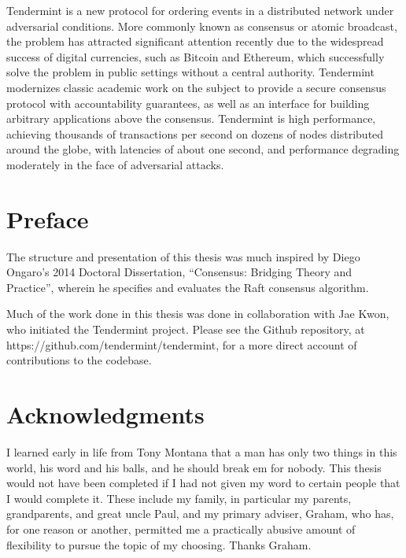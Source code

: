 \vspace{0.9cm}
Tendermint is a new protocol for ordering events in a distributed network under adversarial conditions.
More commonly known as consensus or atomic broadcast, the problem has attracted significant attention
recently due to the widespread success of digital currencies, such as Bitcoin and Ethereum,
which successfully solve the problem in public settings without a central authority.
Tendermint modernizes classic academic work on the subject to provide a secure consensus protocol with 
accountability guarantees, as well as an interface for building arbitrary applications above the consensus.
Tendermint is high performance, achieving thousands of transactions per second on dozens of nodes distributed around the globe,
with latencies of about one second, and performance degrading moderately in the face of adversarial attacks.

\clearpage

\thispagestyle{plain}
\par\vspace*{.35\textheight}{\centering Dedicated to Theda. \par}

\chapter*{Preface}
The structure and presentation of this thesis was much inspired by Diego Ongaro's 2014 Doctoral Dissertation, 
``Consensus: Bridging Theory and Practice'', wherein he specifies and evaluates the Raft consensus algorithm.

Much of the work done in this thesis was done in collaboration with Jae Kwon, who initiated the Tendermint project.
Please see the Github repository, at https://github.com/tendermint/tendermint, for a more direct account of contributions to the codebase.


\chapter*{Acknowledgments}
I learned early in life from Tony Montana that a man has only two things in this world, his word and his balls, and he should break em for nobody.
This thesis would not have been completed if I had not given my word to certain people that I would complete it.
These include my family, in particular my parents, grandparents, and great uncle Paul, and my primary adviser, Graham,
who has, for one reason or another, permitted me a practically abusive amount of flexibility to pursue the topic of my choosing.
Thanks Graham.

